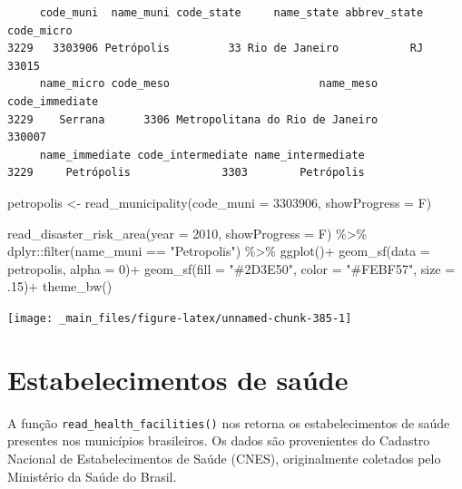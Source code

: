 \documentclass[
  brazilian,
]{book}
\newenvironment{Shaded}{\begin{snugshade}}{\end{snugshade}}
\newcommand{\AttributeTok}[1]{\textcolor[rgb]{0.77,0.63,0.00}{#1}}
\newcommand{\DecValTok}[1]{\textcolor[rgb]{0.00,0.00,0.81}{#1}}
\newcommand{\FunctionTok}[1]{\textcolor[rgb]{0.00,0.00,0.00}{#1}}
\newcommand{\NormalTok}[1]{#1}
\newcommand{\OtherTok}[1]{\textcolor[rgb]{0.56,0.35,0.01}{#1}}
\newcommand{\SpecialCharTok}[1]{\textcolor[rgb]{0.00,0.00,0.00}{#1}}
\newcommand{\StringTok}[1]{\textcolor[rgb]{0.31,0.60,0.02}{#1}}
\begin{document}
\begin{verbatim}
     code_muni  name_muni code_state     name_state abbrev_state code_micro
3229   3303906 Petrópolis         33 Rio de Janeiro           RJ      33015
     name_micro code_meso                       name_meso code_immediate
3229    Serrana      3306 Metropolitana do Rio de Janeiro         330007
     name_immediate code_intermediate name_intermediate
3229     Petrópolis              3303        Petrópolis
\end{verbatim}

\begin{Shaded}
\begin{Highlighting}[]
\NormalTok{petropolis }\OtherTok{\textless{}{-}} \FunctionTok{read\_municipality}\NormalTok{(}\AttributeTok{code\_muni =} \DecValTok{3303906}\NormalTok{,}
                                \AttributeTok{showProgress =}\NormalTok{ F)}

\FunctionTok{read\_disaster\_risk\_area}\NormalTok{(}\AttributeTok{year =} \DecValTok{2010}\NormalTok{,}
                        \AttributeTok{showProgress =}\NormalTok{ F) }\SpecialCharTok{\%\textgreater{}\%}
\NormalTok{  dplyr}\SpecialCharTok{::}\FunctionTok{filter}\NormalTok{(name\_muni }\SpecialCharTok{==} \StringTok{"Petropolis"}\NormalTok{) }\SpecialCharTok{\%\textgreater{}\%}
  \FunctionTok{ggplot}\NormalTok{()}\SpecialCharTok{+}
  \FunctionTok{geom\_sf}\NormalTok{(}\AttributeTok{data =}\NormalTok{ petropolis, }\AttributeTok{alpha =} \DecValTok{0}\NormalTok{)}\SpecialCharTok{+}
  \FunctionTok{geom\_sf}\NormalTok{(}\AttributeTok{fill =} \StringTok{"\#2D3E50"}\NormalTok{, }\AttributeTok{color =} \StringTok{"\#FEBF57"}\NormalTok{, }\AttributeTok{size =}\NormalTok{ .}\DecValTok{15}\NormalTok{)}\SpecialCharTok{+}
  \FunctionTok{theme\_bw}\NormalTok{()}
\end{Highlighting}
\end{Shaded}

\begin{center}\texttt{[image: \_main\_files/figure-latex/unnamed-chunk-385-1]} \end{center}

\hypertarget{estabelecimentos-de-sauxfade}{%
\section{Estabelecimentos de saúde}\label{estabelecimentos-de-sauxfade}}

A função \texttt{read\_health\_facilities()} nos retorna os estabelecimentos de saúde presentes nos municípios brasileiros. Os dados são provenientes do Cadastro Nacional de Estabelecimentos de Saúde (CNES), originalmente coletados pelo Ministério da Saúde do Brasil.
\end{document}
